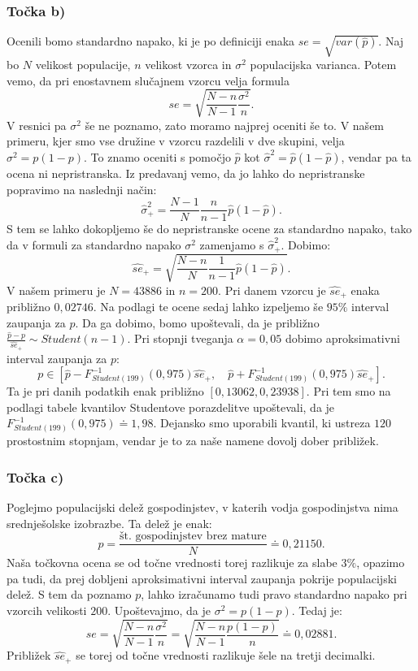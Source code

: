 \documentclass[12pt, letterpaper]{article}
\begin{document}
\subsubsection*{Točka b)} Ocenili bomo standardno napako, ki je po definiciji enaka $se = \sqrt{var(\hat{p})}$. Naj bo $N$ velikost populacije, $n$ velikost vzorca in $\sigma^2$ populacijska varianca. Potem vemo, da pri enostavnem slučajnem vzorcu velja formula
\[
se = \sqrt{\frac{N-n}{N-1}\frac{\sigma^2}{n}}.
\]
V resnici pa $\sigma^2$ še ne poznamo, zato moramo najprej oceniti še to. V našem primeru, kjer smo vse družine v vzorcu razdelili v dve skupini, velja $\sigma^2 = p(1-p)$. To znamo oceniti s pomočjo $\hat{p}$ kot $\hat{\sigma}^2 = \hat{p}(1 - \hat{p})$, vendar pa ta ocena ni nepristranska. Iz predavanj vemo, da jo lahko do nepristranske popravimo na naslednji način:
\[
\hat{\sigma}^2_+ = \frac{N-1}{N}\frac{n}{n-1} \hat{p}(1 - \hat{p}).
\]
S tem se lahko dokopljemo še do nepristranske ocene za standardno napako, tako da v formuli za standardno napako $\sigma^2$ zamenjamo s $\hat{\sigma}^2_+$. Dobimo:
\[
\hat{se}_+ = \sqrt{\frac{N-n}{N}\frac{1}{n-1}\hat{p}(1 - \hat{p})}.
\]
V našem primeru je $N = 43886$ in $n = 200$. Pri danem vzorcu je $\hat{se}_+$ enaka približno $0,02746$. Na podlagi te ocene sedaj lahko izpeljemo še $95\%$ interval zaupanja za $p$. Da ga dobimo, bomo upoštevali, da je približno $\frac{\hat{p} - p}{\hat{se}_+} \sim Student(n-1)$. Pri stopnji tveganja $\alpha = 0,05$ dobimo aproksimativni interval zaupanja za $p$:
\[
p \in \left[\hat{p} - F_{Student(199)}^{-1}(0,975)\hat{se}_+, \quad \hat{p} + F_{Student(199)}^{-1}(0,975)\hat{se}_+\right].
\]
Ta je pri danih podatkih enak približno $[0,13062, 0,23938]$. Pri tem smo na podlagi tabele kvantilov Studentove porazdelitve upoštevali, da je $F_{Student(199)}^{-1}(0,975) \doteq 1,98$. Dejansko smo uporabili kvantil, ki ustreza $120$ prostostnim stopnjam, vendar je to za naše namene dovolj dober približek.

\subsubsection*{Točka c)} Poglejmo populacijski delež gospodinjstev, v katerih vodja gospodinjstva nima srednješolske izobrazbe. Ta delež je enak:
\[
p = \frac{\text{št. gospodinjstev brez mature}}{N} \doteq 0,21150.
\]
Naša točkovna ocena se od točne vrednosti torej razlikuje za slabe $3\%$, opazimo pa tudi, da prej dobljeni aproksimativni interval zaupanja pokrije populacijski delež.
S tem da poznamo $p$, lahko izračunamo tudi pravo standardno napako pri vzorcih velikosti $200$.
Upoštevajmo, da je $\sigma^2 = p(1-p)$. Tedaj je:
\[
se = \sqrt{\frac{N-n}{N-1}\frac{\sigma^2}{n}} = \sqrt{\frac{N-n}{N-1}\frac{p(1-p)}{n}} \doteq 0,02881.
\]
Približek $\hat{se}_+$ se torej od točne vrednosti razlikuje šele na tretji decimalki.
\end{document}
